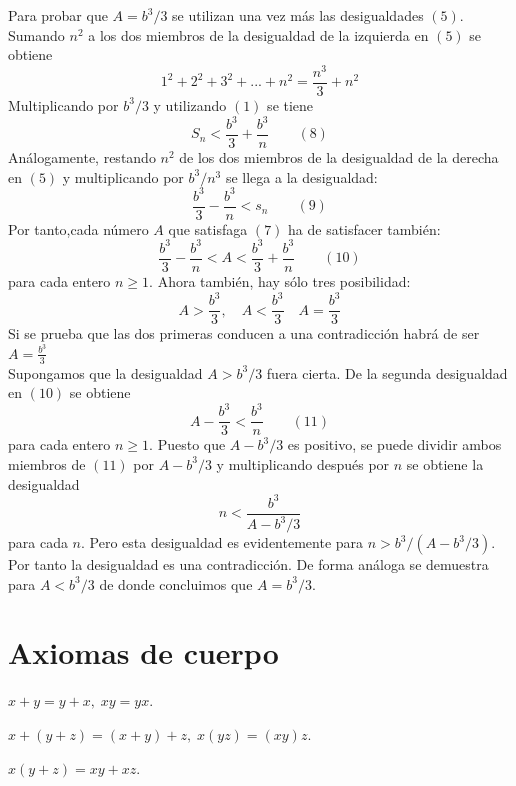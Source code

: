 Para probar que $A=b^3/3$ se utilizan una vez más las desigualdades $(5)$. Sumando $n^2$ a los dos miembros de la desigualdad de la izquierda en $(5)$ se obtiene $$1^2+2^2+3^2+...+n^2=\dfrac{n^3}{3}+n^2$$
Multiplicando por $b^3/3$ y utilizando $(1)$ se tiene $$S_n<\dfrac{b^3}{3}+\dfrac{b^3}{n} \qquad (8)$$
Análogamente, restando $n^2$ de los dos miembros de la desigualdad de la derecha en $(5)$ y multiplicando por $b^3/n^3$ se llega a la desigualdad:
$$\dfrac{b^3}{3}-\dfrac{b^3}{n}<s_n \qquad (9)$$
Por tanto,cada número $A$ que satisfaga $(7)$ ha de satisfacer también: $$\dfrac{b^3}{3}-\dfrac{b^3}{n}<A<\dfrac{b^3}{3}+\dfrac{b^3}{n} \qquad (10)$$ para cada entero $n\geq 1$. Ahora también, hay sólo tres posibilidad: $$A>\dfrac{b^3}{3}, \quad A<\dfrac{b^3}{3} \quad A=\dfrac{b^3}{3}$$
 Si se prueba que las dos primeras conducen a una contradicción habrá de ser $A=\frac{b^3}{3}$\\
 Supongamos que la desigualdad $A>b^3/3$ fuera cierta. De la segunda desigualdad en $(10)$ se obtiene $$A-\dfrac{b^3}{3}<\dfrac{b^3}{n} \qquad (11)$$ para cada entero $n\geq 1$. Puesto que $A-b^3/3$ es positivo, se puede dividir ambos miembros de $(11)$ por $A-b^3/3$ y multiplicando después por $n$ se obtiene la desigualdad $$n<\dfrac{b^3}{A-b^3/3}$$ para cada $n$. Pero esta desigualdad es evidentemente para $n>b^3/(A-b^3/3).$ Por tanto la desigualdad es una contradicción. De forma análoga se demuestra para $A<b^3/3$ de donde concluimos que $A=b^3/3$.\\

\newpage
{}
\setcounter{chapter}{3}
\setcounter{section}{1}
\section{Axiomas de cuerpo}
\begin{axioma} $x+y=y+x, \; xy=yx$.\\
\end{axioma}

\begin{axioma} $x+(y+z)=(x+y)+z, \; x(yz)=(xy)z$. \\
\end{axioma}

\begin{axioma} $x(y+z)=xy+xz$. \\
\end{axioma}

